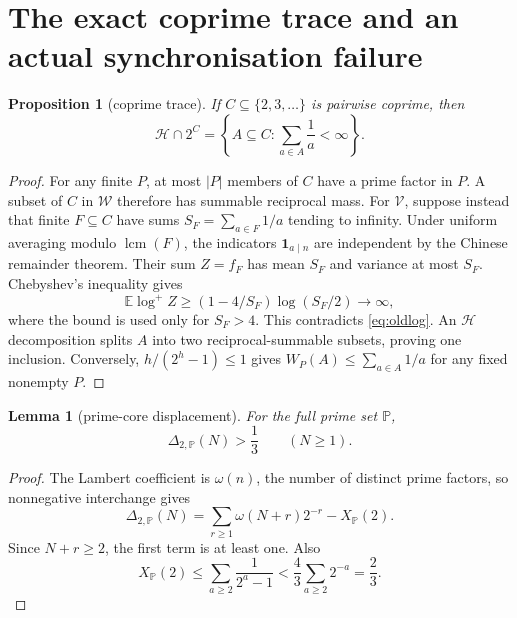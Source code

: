 \documentclass[11pt,a4paper]{article}
\newtheorem{proposition}[theorem]{Proposition}
\newtheorem{lemma}[theorem]{Lemma}
\theoremstyle{definition}\newtheorem{definition}[theorem]{Definition}
\theoremstyle{remark}\newtheorem{remark}[theorem]{Remark}
\newcommand{\PP}{\mathbb P}\newcommand{\RR}{\mathcal R}\newcommand{\HH}{\mathcal H}\newcommand{\WW}{\mathcal W}\newcommand{\VV}{\mathcal V}\newcommand{\EE}{\mathbb E}\newcommand{\LL}{\mathcal L}
\DeclareMathOperator{\lcm}{lcm}
\begin{document}
\section{The exact coprime trace and an actual synchronisation failure}
\begin{proposition}[coprime trace]\label{prop:trace}
If $C\subseteq\{2,3,\ldots\}$ is pairwise coprime, then
\[
 \HH\cap2^C
 =\left\{A\subseteq C:\sum_{a\in A}\frac1a<\infty\right\}.
\]
\end{proposition}
\begin{proof}
For any finite $P$, at most $|P|$ members of $C$ have a prime factor in $P$. A subset of $C$ in $\WW$ therefore has summable reciprocal mass.
For $\VV$, suppose instead that finite $F\subseteq C$ have sums $S_F=\sum_{a\in F}1/a$ tending to infinity. Under uniform averaging modulo $\lcm(F)$, the indicators $\mathbf1_{a\mid n}$ are independent by the Chinese remainder theorem. Their sum $Z=f_F$ has mean $S_F$ and variance at most $S_F$.
Chebyshev's inequality gives
\[
 \EE\log^+Z\ge(1-4/S_F)\log(S_F/2)\longrightarrow\infty,
\]
where the bound is used only for $S_F>4$. This contradicts \eqref{eq:oldlog}.
An $\HH$ decomposition splits $A$ into two reciprocal-summable subsets, proving one inclusion. Conversely, $h/(2^h-1)\le1$ gives $W_P(A)\le\sum_{a\in A}1/a$ for any fixed nonempty $P$.
\end{proof}

\begin{lemma}[prime-core displacement]\label{lem:primegap}
For the full prime set $\PP$,
\[
 \Delta_{2,\PP}(N)>\frac13\qquad(N\ge1).
\]
\end{lemma}
\begin{proof}
The Lambert coefficient is $\omega(n)$, the number of distinct prime factors, so nonnegative interchange gives
\[
 \Delta_{2,\PP}(N)=\sum_{r\ge1}\omega(N+r)2^{-r}-X_{\PP}(2).
\]
Since $N+r\ge2$, the first term is at least one. Also
\[
 X_{\PP}(2)\le\sum_{a\ge2}\frac1{2^a-1}
 <\frac43\sum_{a\ge2}2^{-a}=\frac23.
\]
\end{proof}
\end{document}
